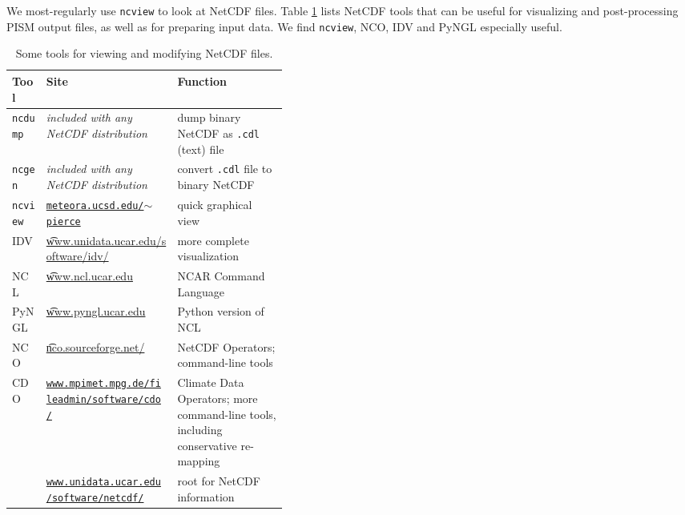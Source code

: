 We most-regularly use \texttt{ncview} to look at NetCDF files.  Table \ref{tab:NetCDFview} lists NetCDF tools that can be useful for visualizing and post-processing PISM output files, as well as for preparing input data.  We find \texttt{ncview}, NCO, IDV and PyNGL especially useful.

\newcommand{\netcdftool}[1]{#1\index{NetCDF!tools!#1}}
\begin{table}[ht]
\centering
\caption{Some tools for viewing and modifying NetCDF files.}\label{tab:NetCDFview} 
\small
\begin{tabular}{llp{0.4\linewidth}}
  \\\toprule
  \textbf{Tool} & \textbf{Site} & \textbf{Function}\\ \midrule
\netcdftool{\texttt{ncdump}} & \emph{included with any NetCDF distribution} & dump binary NetCDF as \texttt{.cdl} (text) file \\
\netcdftool{\texttt{ncgen}} & \emph{included with any NetCDF distribution} & convert \texttt{.cdl} file to binary NetCDF \\
\netcdftool{\texttt{ncview}} & \href{http://meteora.ucsd.edu/~pierce/ncview_home_page.html}{\texttt{meteora.ucsd.edu/$\sim$pierce}} & quick graphical view \\
\netcdftool{IDV} & \href{http://www.unidata.ucar.edu/software/idv/}{\t{www.unidata.ucar.edu/software/idv/}} & more complete visualization \\
\netcdftool{NCL} &  \href{http://www.ncl.ucar.edu}{\t{www.ncl.ucar.edu}} & NCAR Command Language\\
\netcdftool{PyNGL} &  \href{http://www.pyngl.ucar.edu}{\t{www.pyngl.ucar.edu}} & Python version of NCL\\
\netcdftool{NCO}\index{NCO (NetCDF Operators)} & \href{http://nco.sourceforge.net/}{\t{nco.sourceforge.net/}} & NetCDF Operators; command-line tools\\
\netcdftool{CDO} & \href{http://code.zmaw.de/projects/cdo}{\texttt{www.mpimet.mpg.de/fileadmin/software/cdo/}} & Climate Data Operators; more command-line tools, including conservative re-mapping \\
 & \href{http://www.unidata.ucar.edu/software/netcdf/}{\texttt{www.unidata.ucar.edu/software/netcdf/}} & root for NetCDF information
\\\bottomrule
\end{tabular}
\normalsize
\end{table}




